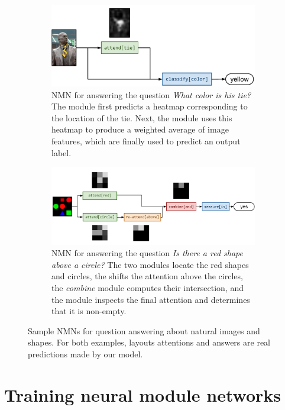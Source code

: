 \begin{figure}
  \begin{subfigure}[t]{0.4\textwidth}
    \includegraphics[width=\textwidth]{fig/full1}
    \caption{NMN for answering the question \emph{What color is
    his tie?} The  module first predicts a heatmap
    corresponding to the location of the tie. Next, the 
    module uses this heatmap to produce a weighted average of image features,
  which are finally used to predict an output label.}
  \end{subfigure}
  \hfill
  \begin{subfigure}[t]{0.55\textwidth}
    \includegraphics[width=\textwidth]{fig/full2}
    \caption{NMN for answering the question \emph{Is there a red shape above a
    circle?} The two  modules locate the red shapes and circles,
    the  shifts the attention above the circles, the
    \emph{combine} module computes their intersection, and the
     module inspects the final attention and determines
  that it is non-empty.}
  \end{subfigure}
  \caption{Sample NMNs for question answering about natural images and shapes.
  For both examples, layouts attentions and answers are real predictions made by
  our model.}
\end{figure}

\section{Training neural module networks}

